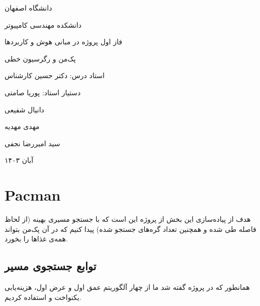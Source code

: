 \documentclass[11pt, a4paper, oneside]{book}
\begin{document}
	\frontmatter
	
	\begin{titlepage}
		\centering
		\par
	
		\vspace{1cm}
    \par %
		
		\vspace{5mm}
		{\LARGE دانشگاه اصفهان}\par
		\vspace{5mm}
		{\Large دانشکده مهندسی کامپیوتر}\par
		
		\vspace{2cm}
		
		{\Large فاز اول پروژه در مبانی هوش و کاربردها}\par
		\vspace{1cm}
		{\Huge پک‌من و رگرسیون خطی}\par
		
		
		\vspace{2cm}
		{\Large استاد درس: دکتر حسین کارشناس}\par
		\vspace{0.5cm}
		{\Large دستیار استاد: پوریا صامتی}
		
		\vspace{1.2cm}
		{\Large دانیال شفیعی}\par
		{\Large مهدی مهدیه}\par
		{\Large سید امیررضا نجفی}\par
		
		\vspace{2cm}
		
		{\large آبان ۱۴۰۳\par}
	\end{titlepage}
	\tableofcontents
	\newpage
	\mainmatter
	
	\chapter{Pacman}
	هدف از پیاده‌سازی این بخش از پروژه این است که با جستجو مسیری بهینه (از لحاظ فاصله طی شده و همچنین تعداد گره‌های جستجو شده) پیدا کنیم که در آن پک‌من بتواند همه‌ی غذاها را بخورد.
	\section{توابع جستجوی مسیر}
	همانطور که در پروژه گفته شد ما از چهار آلگوریتم  عمق اول و عرض اول، هزینه‌یابی یکنواخت و  
	 استفاده کردیم.
	 
\end{document}
